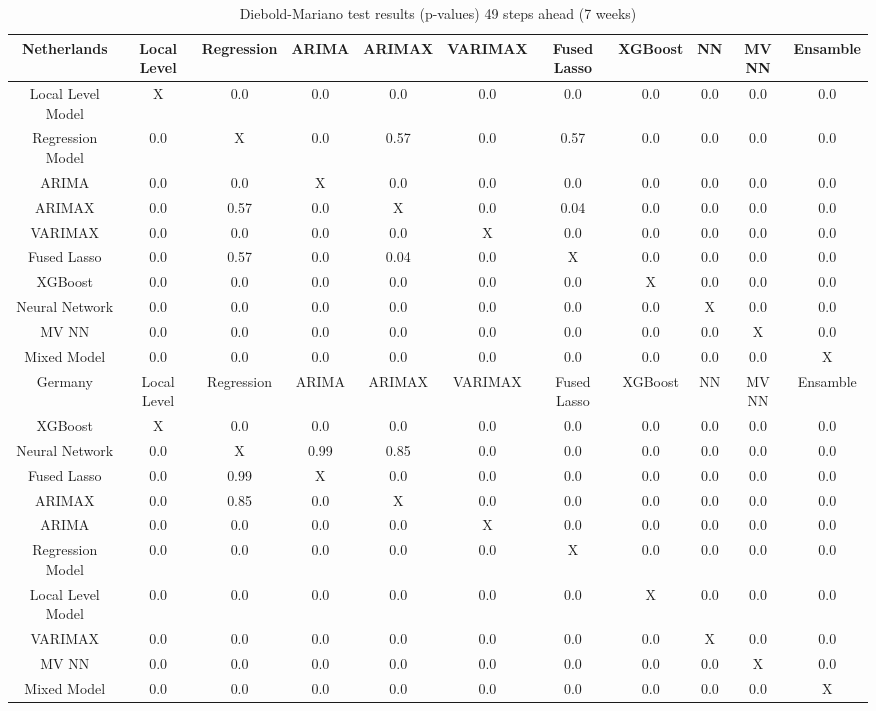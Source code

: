 \begin{landscape}
\pagestyle{empty}
\begin{table}[]
    \centering
    \begin{tabular}{|c|c c c c c c c c c c|}\hline
        Netherlands &  Local Level & Regression & ARIMA & ARIMAX & VARIMAX & Fused Lasso & XGBoost & NN & MV NN & Ensamble\\\hline
        Local Level Model & X & 0.0 & 0.0 & 0.0 & 0.0 & 0.0 & 0.0 & 0.0 & 0.0 & 0.0\\
        Regression Model & 0.0 & X & 0.0 & 0.57 & 0.0 & 0.57 & 0.0 & 0.0 & 0.0 & 0.0\\
        ARIMA & 0.0 & 0.0 & X & 0.0 & 0.0 & 0.0 & 0.0 & 0.0 & 0.0 & 0.0\\
        ARIMAX & 0.0 & 0.57 & 0.0 & X & 0.0 & 0.04 & 0.0 & 0.0 & 0.0 & 0.0\\
        VARIMAX & 0.0 & 0.0 & 0.0 & 0.0 & X & 0.0 & 0.0 & 0.0 & 0.0 & 0.0\\
        Fused Lasso & 0.0 & 0.57 & 0.0 & 0.04 & 0.0 & X & 0.0 & 0.0 & 0.0 & 0.0\\
        XGBoost & 0.0 & 0.0 & 0.0 & 0.0 & 0.0 & 0.0 & X & 0.0 & 0.0 & 0.0\\
        Neural Network & 0.0 & 0.0 & 0.0 & 0.0 & 0.0 & 0.0 & 0.0 & X & 0.0 & 0.0\\
        MV NN & 0.0 & 0.0 & 0.0 & 0.0 & 0.0 & 0.0 & 0.0 & 0.0 & X & 0.0\\
        Mixed Model & 0.0 & 0.0 & 0.0 & 0.0 & 0.0 & 0.0 & 0.0 & 0.0 & 0.0 & X\\\hline\hline
        Germany &  Local Level & Regression & ARIMA & ARIMAX & VARIMAX & Fused Lasso& XGBoost & NN & MV NN & Ensamble\\\hline
        XGBoost & X & 0.0 & 0.0 & 0.0 & 0.0 & 0.0 & 0.0 & 0.0 & 0.0 & 0.0\\
        Neural Network & 0.0 & X & 0.99 & 0.85 & 0.0 & 0.0 & 0.0 & 0.0 & 0.0 & 0.0\\
        Fused Lasso & 0.0 & 0.99 & X & 0.0 & 0.0 & 0.0 & 0.0 & 0.0 & 0.0 & 0.0\\
        ARIMAX & 0.0 & 0.85 & 0.0 & X & 0.0 & 0.0 & 0.0 & 0.0 & 0.0 & 0.0\\
        ARIMA & 0.0 & 0.0 & 0.0 & 0.0 & X & 0.0 & 0.0 & 0.0 & 0.0 & 0.0\\
        Regression Model & 0.0 & 0.0 & 0.0 & 0.0 & 0.0 & X & 0.0 & 0.0 & 0.0 & 0.0\\
        Local Level Model & 0.0 & 0.0 & 0.0 & 0.0 & 0.0 & 0.0 & X & 0.0 & 0.0 & 0.0\\
        VARIMAX & 0.0 & 0.0 & 0.0 & 0.0 & 0.0 & 0.0 & 0.0 & X & 0.0 & 0.0\\
        MV NN & 0.0 & 0.0 & 0.0 & 0.0 & 0.0 & 0.0 & 0.0 & 0.0 & X & 0.0\\
        Mixed Model & 0.0 & 0.0 & 0.0 & 0.0 & 0.0 & 0.0 & 0.0 & 0.0 & 0.0 & X\\
    \hline
    \end{tabular}
    \caption{Diebold-Mariano test results (p-values) 49 steps ahead (7 weeks)}
    \label{tab:7 weeks ahead dm}
\end{table}
\end{landscape}